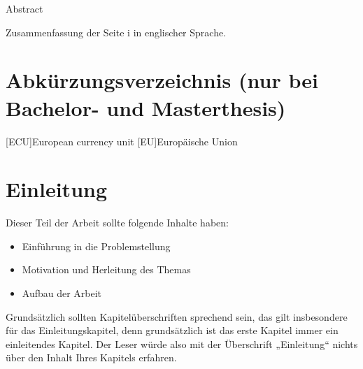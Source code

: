 \documentclass[12pt, oneside]{article}
\begin{document}
\Zusammenfassung
{Abstract}
{
Zusammenfassung der Seite i in englischer Sprache.

}


\tableofcontents



\newpage

\listoffigures
{}%



\newpage

%
\listoftables


\newpage

\section*{Abkürzungsverzeichnis (nur bei Bachelor- und Masterthesis)}
%


\begin{acronym}[ECU]
[ECU]{European currency unit}
[EU]{Europäische Union}
\end{acronym}



\newpage
{}
\setcounter{page}{1}
  
  


\section{Einleitung} \label{einleitung}
Dieser Teil der Arbeit sollte folgende Inhalte haben:
\begin{itemize}
    \item Einführung in die Problemstellung
    \item Motivation und Herleitung des Themas
    \item Aufbau der Arbeit
\end{itemize}
Grundsätzlich sollten Kapitelüberschriften sprechend sein, das gilt insbesondere für das Einleitungskapitel, denn grundsätzlich ist das erste Kapitel immer ein einleitendes Kapitel. Der Leser würde also mit der Überschrift „Einleitung“ nichts über den Inhalt Ihres Kapitels erfahren. 
\end{document}

